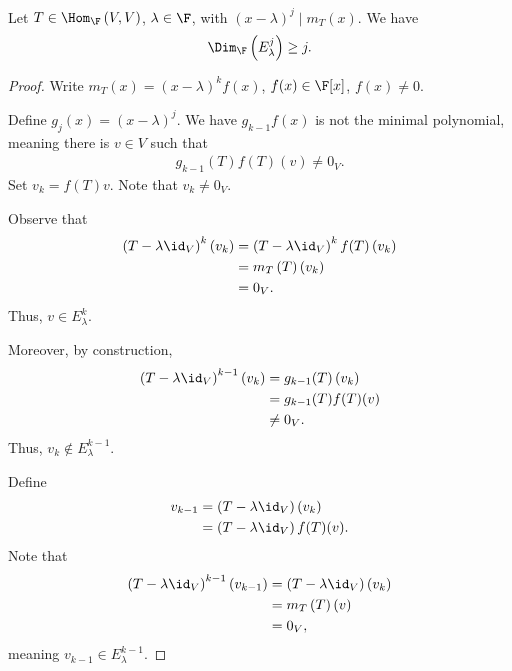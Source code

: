 \documentclass[10pt]{mypackage}
\begin{document}
\begin{theorem}
  Let $T\in \Hom_{\F}\left(V,V\right)$, $\lambda \in \F$, with $\left(x-\lambda\right)^{j}\mid m_{T}\left(x\right)$. We have
  \begin{align*}
    \Dim_{\F}\left(E_{\lambda}^{j}\right) \geq j.
  \end{align*}
\end{theorem}
\begin{proof}
  Write $m_T(x) = \left(x-\lambda\right)^{k}f(x)$, $f(x)\in \F[x]$, $f(x)\neq 0$.\newline

  Define $g_j\left(x\right) = \left(x-\lambda\right)^{j}$. We have $g_{k-1}f(x)$ is not the minimal polynomial, meaning there is $v\in V$ such that
  \begin{align*}
    g_{k-1}\left(T\right)f(T)(v) \neq 0_V.
  \end{align*}
  Set $v_k = f(T) v$. Note that $v_k \neq 0_V$.\newline

  Observe that 
  \begin{align*}
    \left(T - \lambda \id_{V}\right)^k\left(v_k\right) &= \left(T-\lambda \id_V\right)^{k}f(T) \left(v_k\right)\\
                                                       &= m_{T}\left(T\right)\left(v_k\right)\\
                                                       &= 0_V.
  \end{align*}
  Thus, $v\in E_{\lambda}^{k}$.\newline

  Moreover, by construction, 
  \begin{align*}
    \left(T-\lambda\id_{V}\right)^{k-1}\left(v_k\right) &= g_{k-1}(T)\left(v_k\right)\\
                                                        &= g_{k-1}(T)f(T)(v)\\
                                                        &\neq 0_{V}.
  \end{align*}
  Thus, $v_k\notin E_{\lambda}^{k-1}$.\newline

  Define
  \begin{align*}
    v_{k-1} &= \left(T - \lambda \id_V\right)\left(v_k\right)\\
            &= \left(T - \lambda \id_V\right)f(T)(v).
  \end{align*}
  Note that
  \begin{align*}
    \left(T - \lambda \id_V\right)^{k-1}\left(v_{k-1}\right) &= \left(T - \lambda\id_V\right)\left(v_k\right)\\
                                                             &= m_T\left(T\right)(v)\\
                                                             &= 0_V,
  \end{align*}
  meaning $v_{k-1}\in E_{\lambda}^{k-1}$.\newline


\end{proof}
\end{document}
